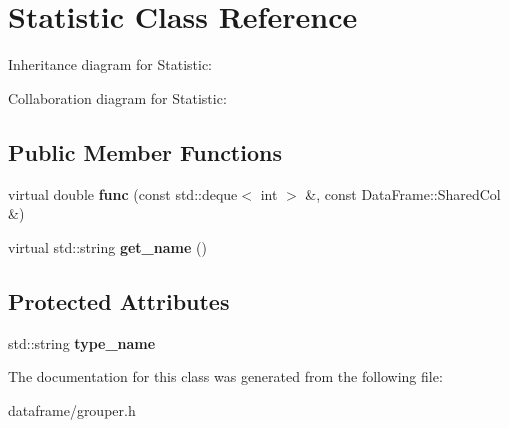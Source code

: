 \hypertarget{classStatistic}{}\section{Statistic Class Reference}
\label{classStatistic}


Inheritance diagram for Statistic\+:


Collaboration diagram for Statistic\+:
\subsection*{Public Member Functions}
\begin{DoxyCompactItemize}
\item 
\mbox{\label{classStatistic_ae31ffb0b5ee2bb195f78d774159ac743}} 
virtual double {\bfseries func} (const std\+::deque$<$ int $>$ \&, const Data\+Frame\+::\+Shared\+Col \&)
\item 
\mbox{\label{classStatistic_ad35bf999ca083408d4e6cf0f09236775}} 
virtual std\+::string {\bfseries get\+\_\+name} ()
\end{DoxyCompactItemize}
\subsection*{Protected Attributes}
\begin{DoxyCompactItemize}
\item 
\mbox{\label{classStatistic_ab772f6a95311fbfd0657c5df29d05b9b}} 
std\+::string {\bfseries type\+\_\+name}
\end{DoxyCompactItemize}


The documentation for this class was generated from the following file\+:\begin{DoxyCompactItemize}
\item 
dataframe/grouper.\+h\end{DoxyCompactItemize}

